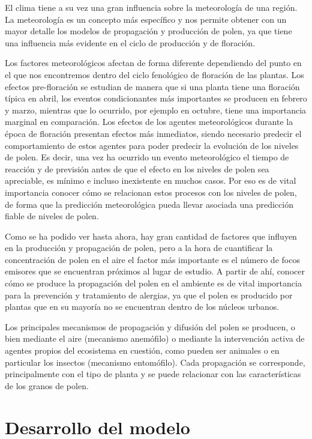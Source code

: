 \documentclass[12pt,oneside,a4paper]{article}
\numberwithin{figure}{section}
\begin{document}
El clima tiene a su vez una gran influencia sobre la meteorología de una región. La meteorología es un concepto más específico y nos permite obtener con un mayor detalle los modelos de propagación y producción de polen, ya que tiene una influencia más evidente en el ciclo de producción y de floración.

Los factores meteorológicos afectan de forma diferente dependiendo del punto en el que nos encontremos dentro del ciclo fenológico de floración de las plantas. Los efectos pre-floración se estudian de manera que si una planta tiene una floración típica en abril, los eventos condicionantes más importantes se producen en febrero y marzo, mientras que lo ocurrido, por ejemplo en octubre, tiene una importancia marginal en comparación. Los efectos de los agentes meteorológicos durante la época de floración presentan efectos más inmediatos, siendo necesario predecir el comportamiento de estos agentes para poder predecir la evolución de los niveles de polen. Es decir, una vez ha ocurrido un evento meteorológico el tiempo de reacción y de previsión antes de que el efecto en los niveles de polen sea apreciable, es mínimo e incluso inexistente en muchos casos. Por eso es de vital importancia conocer cómo se relacionan estos procesos con los niveles de polen, de forma que la predicción meteorológica pueda llevar asociada una predicción fiable de niveles de polen. 

Como se ha podido ver hasta ahora, hay gran cantidad de factores que influyen en la producción y propagación de polen, pero a la hora de cuantificar la concentración de polen en el aire el factor más importante es el número de focos emisores que se encuentran próximos al lugar de estudio. A partir de ahí, conocer cómo se produce la propagación del polen en el ambiente es de vital importancia para la prevención y tratamiento de alergias, ya que el polen es producido por plantas que en su mayoría no se encuentran dentro de los núcleos urbanos.

Los principales mecanismos de propagación y difusión del polen se producen, o bien mediante el aire (mecanismo anemófilo) o mediante la intervención activa de agentes propios del ecosistema en cuestión, como pueden ser animales o en particular los insectos (mecanismo entomófilo). Cada propagación se corresponde, principalmente con el tipo de planta y se puede relacionar con las características de los granos de polen. 



\section{Desarrollo del modelo}
\end{document}
